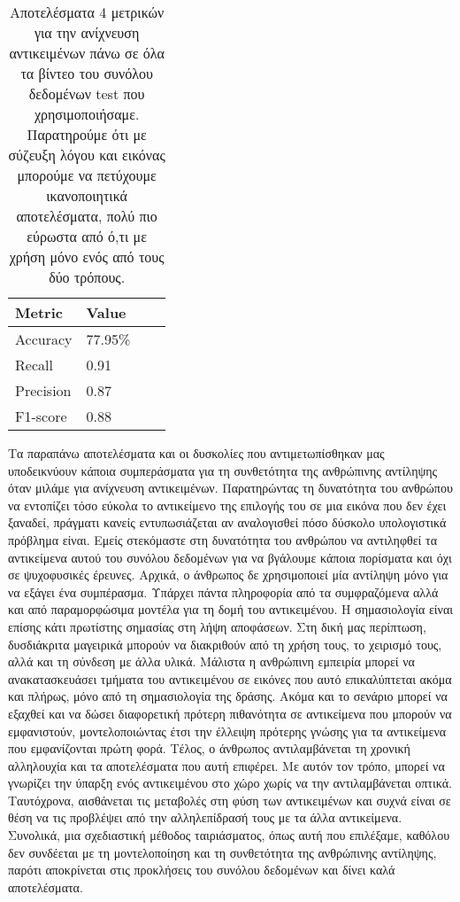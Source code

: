 \documentclass[11pt,a4paper,english,greek,twoside]{../Thesis}
\begin{document}
\begin{table}
	\centering
    \begin{tabular}{| l | l | l | l |}
    \hline
    \textbf{Metric} & \textbf{Value} \\ \hline
    Accuracy & 77.95\% \\ \hline
    Recall & 0.91 \\ \hline
    Precision & 0.87 \\ \hline
    F1-score & 0.88 \\
    \hline
    \end{tabular}
	\caption{Αποτελέσματα 4 μετρικών για την ανίχνευση αντικειμένων πάνω σε όλα τα βίντεο του συνόλου δεδομένων test που χρησιμοποιήσαμε. Παρατηρούμε ότι με σύζευξη λόγου και εικόνας μπορούμε να πετύχουμε ικανοποιητικά αποτελέσματα, πολύ πιο εύρωστα από ό,τι με χρήση μόνο ενός από τους δύο τρόπους.}
	\label{tab:ObjeResult}
\end{table}

\par Τα παραπάνω αποτελέσματα και οι δυσκολίες που αντιμετωπίσθηκαν μας υποδεικνύουν κάποια συμπεράσματα για τη συνθετότητα της ανθρώπινης αντίληψης όταν μιλάμε για ανίχνευση αντικειμένων. Παρατηρώντας τη δυνατότητα του ανθρώπου να εντοπίζει τόσο εύκολα το αντικείμενο της επιλογής του σε μια εικόνα που δεν έχει ξαναδεί, πράγματι κανείς εντυπωσιάζεται αν αναλογισθεί πόσο δύσκολο υπολογιστικά πρόβλημα είναι. Εμείς στεκόμαστε στη δυνατότητα του ανθρώπου να αντιληφθεί τα αντικείμενα αυτού του συνόλου δεδομένων για να βγάλουμε κάποια πορίσματα και όχι σε ψυχοφυσικές έρευνες. Αρχικά, ο άνθρωπος δε χρησιμοποιεί μία αντίληψη μόνο για να εξάγει ένα συμπέρασμα. Υπάρχει πάντα πληροφορία από τα συμφραζόμενα αλλά και από παραμορφώσιμα μοντέλα για τη δομή του αντικειμένου. Η σημασιολογία είναι επίσης κάτι πρωτίστης σημασίας στη λήψη αποφάσεων. Στη δική μας περίπτωση, δυσδιάκριτα μαγειρικά μπορούν να διακριθούν από τη χρήση τους, το χειρισμό τους, αλλά και τη σύνδεση με άλλα υλικά. Μάλιστα η ανθρώπινη εμπειρία μπορεί να ανακατασκευάσει τμήματα του αντικειμένου σε εικόνες που αυτό επικαλύπτεται ακόμα και πλήρως, μόνο από τη σημασιολογία της δράσης. Ακόμα και το σενάριο μπορεί να εξαχθεί και να δώσει διαφορετική πρότερη πιθανότητα σε αντικείμενα που μπορούν να εμφανιστούν, μοντελοποιώντας έτσι την έλλειψη πρότερης γνώσης για τα αντικείμενα που εμφανίζονται πρώτη φορά. Τέλος, ο άνθρωπος αντιλαμβάνεται τη χρονική αλληλουχία και τα αποτελέσματα που αυτή επιφέρει. Με αυτόν τον τρόπο, μπορεί να γνωρίζει την ύπαρξη ενός αντικειμένου στο χώρο χωρίς να την αντιλαμβάνεται οπτικά. Ταυτόχρονα, αισθάνεται τις μεταβολές στη φύση των αντικειμένων και συχνά είναι σε θέση να τις προβλέψει από την αλληλεπίδρασή τους με τα άλλα αντικείμενα. Συνολικά, μια σχεδιαστική μέθοδος ταιριάσματος, όπως αυτή που επιλέξαμε, καθόλου δεν συνδέεται με τη μοντελοποίηση και τη συνθετότητα της ανθρώπινης αντίληψης, παρότι αποκρίνεται στις προκλήσεις του συνόλου δεδομένων και δίνει καλά αποτελέσματα.
\end{document}
